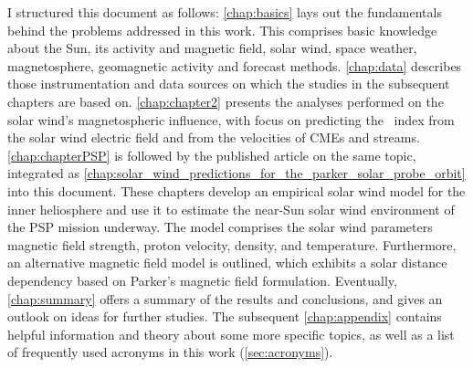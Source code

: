 
\bigskip

I structured this document as follows: \autoref{chap:basics} lays out the fundamentals behind the problems addressed in this work. This comprises basic knowledge about the Sun, its activity and magnetic field, solar wind, space weather, magnetosphere, geomagnetic activity and forecast methods. \autoref{chap:data} describes those instrumentation and data sources on which the studies in the subsequent chapters are based on. \autoref{chap:chapter2} presents the analyses performed on the solar wind's magnetospheric influence, with focus on predicting the \Kp~index from the solar wind electric field and from the velocities of CMEs and streams. \autoref{chap:chapterPSP} is followed by the published article on the same topic, integrated as \autoref{chap:solar_wind_predictions_for_the_parker_solar_probe_orbit} into this document. These chapters develop an empirical solar wind model for the inner heliosphere and use it to estimate the near-Sun solar wind environment of the PSP mission underway. The model comprises the solar wind parameters magnetic field strength, proton velocity, density, and temperature. Furthermore, an alternative magnetic field model is outlined, which exhibits a solar distance dependency based on Parker's magnetic field formulation. Eventually, \autoref{chap:summary} offers a summary of the results and conclusions, and gives an outlook on ideas for further studies. The subsequent \autoref{chap:appendix} contains helpful information and theory about some more specific topics, as well as a list of frequently used acronyms in this work (\autoref{sec:acronyms}).


